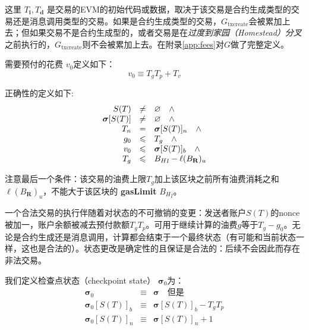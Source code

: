 \documentclass[UTF8,nofonts]{ctexart}
\begin{document}
\begin{multicols}{2}
这里 $T_\mathbf{i},T_\mathbf{d}$ 是交易的EVM的初始代码或数据，取决于该交易是合约生成类型的交易还是消息调用类型的交易。如果是合约生成类型的交易，$G_\text{txcreate}$会被累加上去；但如果交易不是合约生成型的，或者交易是在{\it 过度到家园（Homestead）分叉}之前执行的，$G_\text{txcreate}$则不会被累加上去。在附录\ref{app:fees}对$G$做了完整定义。


需要预付的花费 $v_0$定义如下：
\begin{equation}
v_0 \equiv T_g T_p + T_v
\end{equation}

正确性的定义如下:
\begin{equation}
\begin{array}[t]{rcl}
S(T) & \neq & \varnothing \quad \wedge \\
\boldsymbol{\sigma}[S(T)] & \neq & \varnothing \quad \wedge \\
T_n & = & \boldsymbol{\sigma}[S(T)]_n \quad \wedge \\
g_0 & \leqslant & T_g \quad \wedge \\ 
v_0 & \leqslant & \boldsymbol{\sigma}[S(T)]_b \quad \wedge \\
T_g & \leqslant & {B_H}_l - \ell(B_\mathbf{R})_u
\end{array}
\end{equation}

注意最后一个条件：该交易的油费上限$T_g$加上该区块之前所有油费消耗之和$\ell(B_\mathbf{R})_u$，不能大于该区块的 \textbf{gasLimit} ${B_H}_l$。

一个合法交易的执行伴随着对状态的不可撤销的变更：发送者账户$S(T)$的nonce被加一，账户余额被减去预付款额$T_gT_p$。可用于继续计算的油费$g$等于$T_g - g_0$。无论是合约生成还是消息调用，计算都会结束于一个最终状态（有可能和当前状态一样，这也是合法的）。状态更改是确定性的且保证是合法的：后续不会因此而存在非法交易。

我们定义检查点状态（checkpoint state） $\boldsymbol{\sigma}_0$为：
\begin{eqnarray}
\boldsymbol{\sigma}_0 & \equiv & \boldsymbol{\sigma} \quad \text{但是} \\
\boldsymbol{\sigma}_0[S(T)]_b & \equiv & \boldsymbol{\sigma}[S(T)]_b - T_g T_p \\
\boldsymbol{\sigma}_0[S(T)]_n & \equiv & \boldsymbol{\sigma}[S(T)]_n + 1
\end{eqnarray}


\end{multicols}
\end{document}
